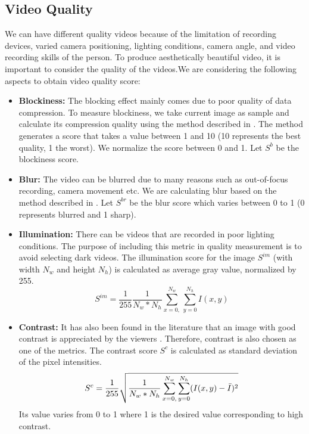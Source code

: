 \documentclass{sig-alternate}
\begin{document}
\subsection{Video Quality}
We can have different quality videos because of the limitation of
recording devices, varied camera positioning, lighting conditions,
camera angle, and video recording skills of the person. To produce
aesthetically beautiful video, it is important to consider the quality of the videos.We are considering the following aspects to obtain video quality score:
 \begin{itemize} 
    \item \textbf{Blockiness:} The blocking effect mainly comes due to poor quality of data compression. To measure blockiness, we take current image as sample and calculate its compression quality using the method described in \cite{18}. The method generates a score that takes a value between 1 and 10 (10 represents the best quality, 1 the worst). We normalize the score between 0 and 1. Let $S^b$ be the blockiness score.
    \item \textbf{Blur:} The video can be blurred due to many reasons such as out-of-focus recording, camera movement etc. We are calculating blur based on the method described in \cite{5}. Let $S^{br}$ be the blur score which varies between 0 to 1 (0 represents blurred and 1 sharp).
    \item \textbf{Illumination:} There can be videos that are recorded in poor lighting conditions. The purpose of including this metric in quality measurement is to avoid selecting dark videos. The illumination score for the image $S^{im}$ (with width $N_w$ and height $N_h$) is calculated as average gray value, normalized by 255.
    \begin{equation}
        S^{im}=\frac{1}{255}\frac{1}{N_w * N_h}\sum_{x=0,}^{N_w}\sum_{y=0}^{N_h} I(x,y)
    \end{equation}
    \item \textbf{Contrast:} It has also been found in the literature that an image with good contrast is appreciated by the viewers \cite{10}. Therefore, contrast is also chosen as one of the metrics. The contrast score $S^c$ is calculated as standard deviation of the pixel intensities.
    \begin{equation}
        S^c=\frac{1}{255}\sqrt{\frac{1}{N_w * N_h}\sum_{x=0,}^{N_w}\sum_{y=0}^{N_h}(I(x,y)-\Bar{I})^2}
    \end{equation}
    Its value varies from 0 to 1 where 1 is the desired value corresponding to high contrast.

\end{itemize}
\end{document}
